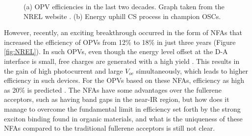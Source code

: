 \documentclass[12pt]{article}
\begin{document}
\begin{figure}[H]
\centering
{}
\caption{(a) OPV efficiencies in the last two decades. Graph taken from the NREL website \cite{NREL}. (b) Energy uphill CS process in champion OSCs.}
\label{fig:hot and cold}
\end{figure}

However, recently, an exciting breakthrough occurred in the form of NFAs that increased the efficiency of OPVs from 12\% to 18\% in just three years (Figure \ref{fig:NREL}). In such OPVs, even though the energy level offset at the D-A interface is small, free charges are generated with a high yield \cite{cheng2018next,hou2018organic,chen2018efficient}. This results in the gain of high photocurrent and large $V_{oc}$ simultaneously, which leads to higher efficiency in such devices. For the OPVs based on these NFAs, efficiency as high as 20\% is predicted \cite{li2018analyzing}.  The NFAs have some advantages over the fullerene acceptors, such as having band gaps in the near-IR region, but how does it manage to overcome the fundamental limit in efficiency set forth by the strong exciton binding found in organic materials, and what is the uniqueness of these NFAs compared to the traditional fullerene acceptors is still not clear. 
\vspace{7pt}
\end{document}
